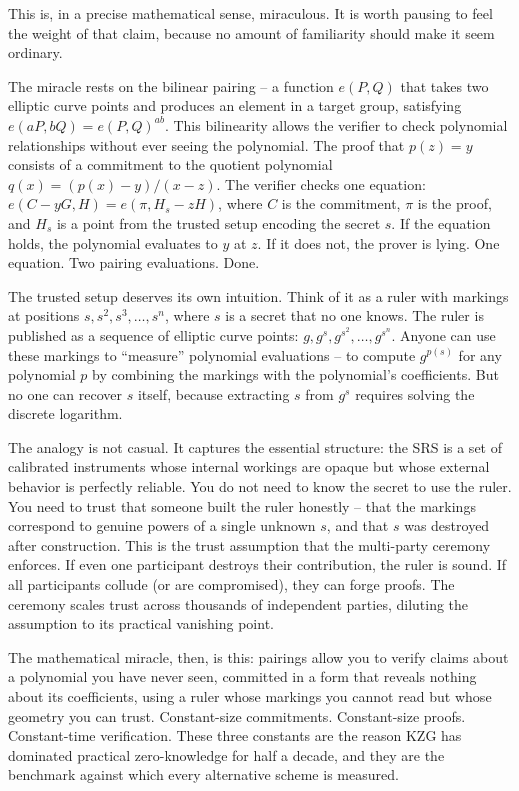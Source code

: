 \documentclass[
  11pt,
  openany]{report}
\begin{document}
This is, in a precise mathematical sense, miraculous. It is worth pausing to
feel the weight of that claim, because no amount of familiarity should make it
seem ordinary.

The miracle rests on the bilinear pairing -- a function \(e(P, Q)\) that takes
two elliptic curve points and produces an element in a target group, satisfying
\(e(aP, bQ) = e(P, Q)^{ab}\). This bilinearity allows the verifier to check
polynomial relationships without ever seeing the polynomial. The proof that
\(p(z) = y\) consists of a commitment to the quotient polynomial
\(q(x) = (p(x) - y) / (x - z)\). The verifier checks one equation:
\(e(C - yG, H) = e(\pi, H_s - zH)\), where \(C\) is the commitment, \(\pi\) is
the proof, and \(H_s\) is a point from the trusted setup encoding the secret
\(s\). If the equation holds, the polynomial evaluates to \(y\) at \(z\). If it
does not, the prover is lying. One equation. Two pairing evaluations. Done.

The trusted setup deserves its own intuition. Think of it as a ruler with
markings at positions \(s, s^2, s^3, \ldots, s^n\), where \(s\) is a secret that
no one knows. The ruler is published as a sequence of elliptic curve points:
\(g, g^s, g^{s^2}, \ldots, g^{s^n}\). Anyone can use these markings to
``measure'' polynomial evaluations -- to compute \(g^{p(s)}\) for any polynomial
\(p\) by combining the markings with the polynomial's coefficients. But no one
can recover \(s\) itself, because extracting \(s\) from \(g^s\) requires solving
the discrete logarithm.

The analogy is not casual. It captures the essential structure: the SRS is a set
of calibrated instruments whose internal workings are opaque but whose external
behavior is perfectly reliable. You do not need to know the secret to use the
ruler. You need to trust that someone built the ruler honestly -- that the
markings correspond to genuine powers of a single unknown \(s\), and that \(s\)
was destroyed after construction. This is the trust assumption that the
multi-party ceremony enforces. If even one participant destroys their
contribution, the ruler is sound. If all participants collude (or are
compromised), they can forge proofs. The ceremony scales trust across thousands
of independent parties, diluting the assumption to its practical vanishing
point.

The mathematical miracle, then, is this: pairings allow you to verify claims
about a polynomial you have never seen, committed in a form that reveals nothing
about its coefficients, using a ruler whose markings you cannot read but whose
geometry you can trust. Constant-size commitments. Constant-size proofs.
Constant-time verification. These three constants are the reason KZG has
dominated practical zero-knowledge for half a decade, and they are the benchmark
against which every alternative scheme is measured.
\end{document}
